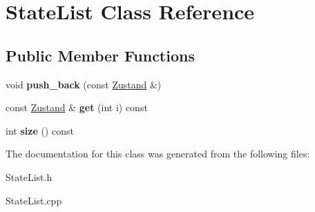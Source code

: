 \hypertarget{class_state_list}{\section{State\-List Class Reference}
\label{class_state_list}
}
\subsection*{Public Member Functions}
\begin{DoxyCompactItemize}
\item 
\hypertarget{class_state_list_a99de18b0bedf17a1ffa0428447de65b7}{void {\bfseries push\-\_\-back} (const \hyperlink{class_zustand}{Zustand} \&)}\label{class_state_list_a99de18b0bedf17a1ffa0428447de65b7}

\item 
\hypertarget{class_state_list_a9cd6865db6fe00d78ff8fa3548e05c33}{const \hyperlink{class_zustand}{Zustand} \& {\bfseries get} (int i) const }\label{class_state_list_a9cd6865db6fe00d78ff8fa3548e05c33}

\item 
\hypertarget{class_state_list_a437648ea11c4de677af043da263d93b1}{int {\bfseries size} () const }\label{class_state_list_a437648ea11c4de677af043da263d93b1}

\end{DoxyCompactItemize}


The documentation for this class was generated from the following files\-:\begin{DoxyCompactItemize}
\item 
State\-List.\-h\item 
State\-List.\-cpp\end{DoxyCompactItemize}
